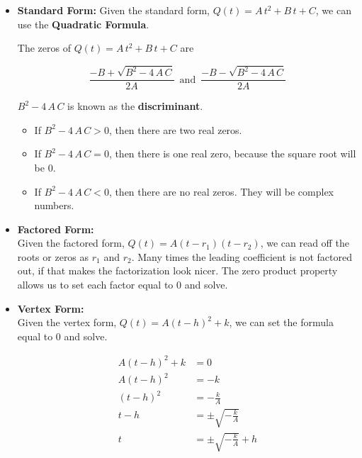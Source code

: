 \documentclass{ximera}
\begin{document}
\begin{itemize}

\item \textbf{\textcolor{purple!85!blue}{Standard Form:}}  Given the standard form, $Q(t) = A \, t^2 + B \, t + C$, we can use the \textbf{Quadratic Formula}.

The zeros of $Q(t) = A \, t^2 + B \, t + C$ are

\[   \frac{-B + \sqrt{B^2 - 4 \, A \, C}}{2A}      \, \text{ and } \,       \frac{-B - \sqrt{B^2 - 4 \, A \, C}}{2A}    \]



$B^2 - 4 \, A \, C$ is known as the \textbf{discriminant}. 




\begin{itemize}
\item If $B^2 - 4 \, A \, C > 0$, then there are two real zeros.
\item If $B^2 - 4 \, A \, C = 0$, then there is one real zero, because the square root will be $0$.
\item If $B^2 - 4 \, A \, C < 0$, then there are no real zeros.  They will be complex numbers.
\end{itemize}





\item \textbf{\textcolor{purple!85!blue}{Factored Form:}} \\ 
Given the factored form, $Q(t) = A (t - r_1)(t - r_2)$, we can read off the roots or zeros as $r_1$ and $r_2$. Many times the leading coefficient is not factored out, if that makes the factorization look nicer.  The zero product property allows us to set each factor equal to $0$ and solve.






\item  \textbf{\textcolor{purple!85!blue}{Vertex Form:}} \\
Given the vertex form, $Q(t) = A (t - h)^2 + k$, we can set the formula equal to $0$ and solve.



\begin{align*}
A (t - h)^2 + k    & = 0  \\
A (t - h)^2        & = -k  \\
(t - h)^2        & = -\frac{k}{A}  \\
t - h        & = \pm \sqrt{-\frac{k}{A}}  \\
t        & = \pm \sqrt{-\frac{k}{A}}  + h
\end{align*}


\end{itemize}
\end{document}
